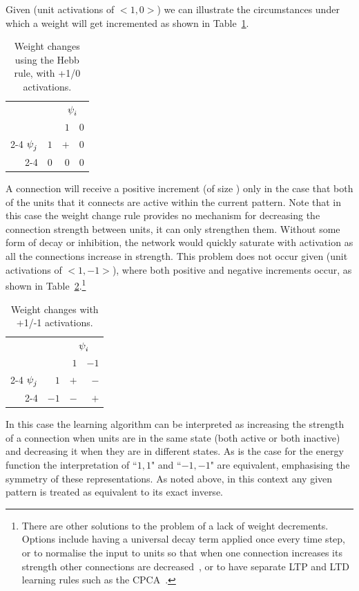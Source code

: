 Given   (unit activations of $<1, 0>$) we can illustrate the circumstances under which a weight will get incremented as shown in Table~\ref{tab:WeightChangesHebbian}.
\begin{table}[htbp]
	\begin{center}
		\begin{tabular}{rr|r|r}
			\multicolumn{2}{r}{}&\multicolumn{2}{c}{\(\psi_{i}^{}\)}\\
						&&$1$&$0$\\
\cline{2-4} $\psi_{j}^{}$&$1$&$+$&$0$\\
\cline{2-4} &$0$&$0$&$0$\\
		\end{tabular}
	\end{center}
	\caption{Weight changes using the Hebb rule, with +1/0 activations.}
	\label{tab:WeightChangesHebbian}
\end{table}
A connection will receive a positive increment (of size \learningConstant) only in the case that both of the units that it connects are active within the current pattern.  Note that in this case the weight change rule provides no mechanism for decreasing the connection strength between units, it can only strengthen them.  Without some form of decay or inhibition, the network would quickly saturate with activation as all the connections increase in strength.  This problem does not occur given   (unit activations of $<1, -1>$), where both positive and negative increments occur, as shown in Table~\ref{tab:WeightChangesHopfield}.\footnote{There are other solutions to the problem of a lack of weight decrements.  Options include having a universal decay term applied once every time step, or to normalise the input to units so that when one connection increases its strength other connections are decreased~\citep{Chechik2001}, or to have separate LTP and LTD learning rules such as the CPCA~\citep{Norman2003}.}
\begin{table}[htbp]
	\begin{center}
		\begin{tabular}{rr|r|r}
			\multicolumn{2}{r}{}&\multicolumn{2}{c}{\(\psi_{i}^{}\)}\\
						&&$1$&$-1$\\
\cline{2-4} $\psi_{j}^{}$&$1$&$+$&$-$\\
\cline{2-4} &$-1$&$-$&$+$\\
		\end{tabular}
	\end{center}
	\caption{Weight changes with +1/-1 activations.}
	\label{tab:WeightChangesHopfield}
\end{table}
In this case the learning algorithm can be interpreted as increasing the strength of a connection when units are in the same state (both active or both inactive) and decreasing it when they are in different states.  As is the case for the energy function the interpretation of  ``$1, 1$" and ``$-1, -1$" are equivalent, emphasising the symmetry of these representations.  As noted above, in this context any given pattern is treated as equivalent to its exact inverse.

